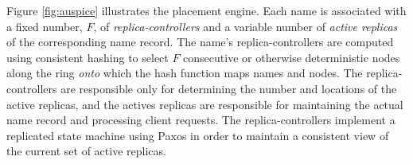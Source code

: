 Figure \ref{fig:auspice} illustrates the placement engine. Each name is associated with a fixed number, $F$, of  \emph{replica-controllers} and a variable number of  {\em active replicas} of the corresponding name record. The name's replica-controllers are computed using consistent hashing to select $F$ consecutive or otherwise deterministic nodes along the ring {\em onto} which the hash function maps names and nodes. The replica-controllers are responsible only for determining the number and locations of the active  replicas, and the actives replicas are responsible for maintaining the actual name record and processing client requests. The replica-controllers implement a replicated state machine using Paxos \cite{LamportPaxos} in order to maintain a consistent view of the current set of active replicas.




%
%
%
%





